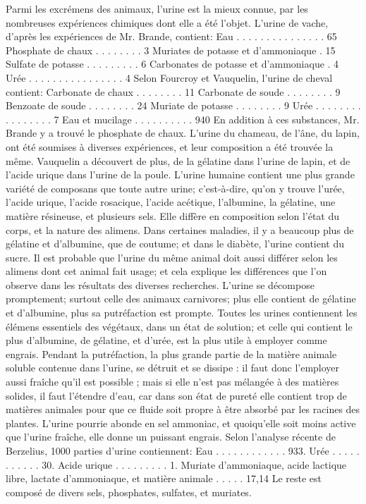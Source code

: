 Parmi les excrémens des animaux, l'urine est la mieux connue, par les nombreuses expériences chimiques dont elle a été l'objet. L'urine de vache, d'après les expériences de Mr. Brande, contient:
Eau . . . . . . . . . . . . . . . 65
Phosphate de chaux . . . . . . . . 3
Muriates de potasse et d'ammoniaque . 15
Sulfate de potasse . . . . . . . . . 6
Carbonates de potasse et d'ammoniaque . 4
Urée . . . . . . . . . . . . . . . . 4
Selon Fourcroy et Vauquelin, l'urine de cheval contient:
Carbonate de chaux . . . . . . . . 11
Carbonate de soude . . . . . . . . 9
Benzoate de soude . . . . . . . . 24
Muriate de potasse . . . . . . . . 9
Urée . . . . . . . . . . . . . . . . 7
Eau et mucilage . . . . . . . . . . 940
En addition à ces substances, Mr. Brande y a trouvé le phosphate de chaux.
L'urine du chameau, de l'âne, du lapin, ont été soumises à diverses expériences, et leur composition a été trouvée la même. Vauquelin\setcounter{page}{174} a découvert de plus, de la gélatine dans l'urine de lapin, et de l'acide urique dans l'urine de la poule.
L'urine humaine contient une plus grande variété de composans que toute autre urine; c'est-à-dire, qu'on y trouve l'urée, l'acide urique, l'acide rosacique, l'acide acétique, l'albumine, la gélatine, une matière résineuse, et plusieurs sels. Elle diffère en composition selon l'état du corps, et la nature des alimens. Dans certaines maladies, il y a beaucoup plus de gélatine et d'albumine, que de coutume; et dans le diabète, l'urine contient du sucre.
Il est probable que l'urine du même animal doit aussi différer selon les alimens dont cet animal fait usage; et cela explique les différences que l'on observe dans les résultats des diverses recherches.
L'urine se décompose promptement; surtout celle des animaux carnivores; plus elle contient de gélatine et d'albumine, plus sa putréfaction est prompte.
Toutes les urines contiennent les élémens essentiels des végétaux, dans un état de solution; et celle qui contient le plus d'albumine, de gélatine, et d'urée, est la plus utile à employer comme engrais.
\setcounter{page}{175} Pendant la putréfaction, la plus grande partie de la matière animale soluble contenue dans l’urine, se détruit et se dissipe : il faut donc l’employer aussi fraîche qu’il est possible ; mais si elle n’est pas mélangée à des matières solides, il faut l’étendre d’eau, car dans son état de pureté elle contient trop de matières animales pour que ce fluide soit propre à être absorbé par les racines des plantes.
L’urine pourrie abonde en sel ammoniac, et quoiqu’elle soit moins active que l’urine fraîche, elle donne un puissant engrais.
Selon l’analyse récente de Berzelius, 1000 parties d’urine contiennent:
Eau . . . . . . . . . . . . 933.
Urée . . . . . . . . . . . 30.
Acide urique . . . . . . . . . 1.
Muriate d’ammoniaque, acide lactique libre, lactate d’ammoniaque, et matière animale . . . . . 17,14
Le reste est composé de divers sels, phosphates, sulfates, et muriates.